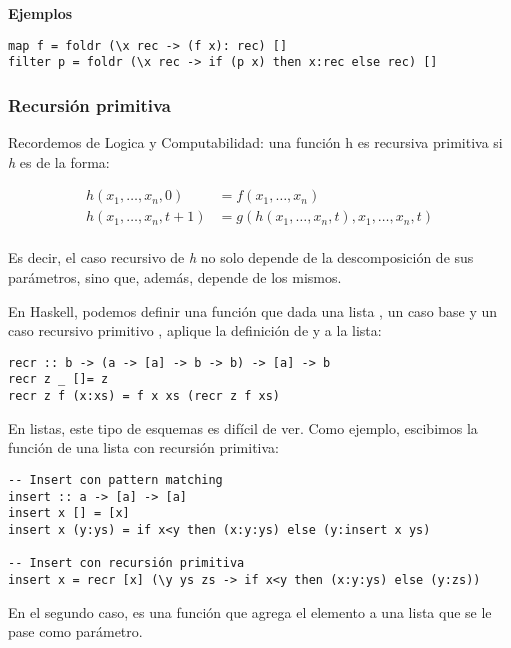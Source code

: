\textbf{Ejemplos}

\begin{centrado}
	\begin{verbatim}
map f = foldr (\x rec -> (f x): rec) []
filter p = foldr (\x rec -> if (p x) then x:rec else rec) []
	\end{verbatim}
\end{centrado}


\subsubsection{Recursión primitiva}
Recordemos de Logica y Computabilidad: una función h es recursiva primitiva si \textit{h} es de la forma:

\begin{align*}
	h(x_1,\dots,x_n,0) &= f(x_1,\dots,x_n) \\
	h(x_1,\dots,x_n,t+1) &= g(h(x_1,\dots,x_n, t),x_1,\dots, x_n, t) \\
\end{align*}

Es decir, el caso recursivo de \textit{h} no solo depende de la descomposición de sus parámetros, sino que, además, depende de los mismos.

En Haskell, podemos definir una función que dada una lista , un caso base  y un caso recursivo primitivo , aplique la definición de  y  a la lista:
\begin{centrado}
	\begin{verbatim}
recr :: b -> (a -> [a] -> b -> b) -> [a] -> b
recr z _ []= z
recr z f (x:xs) = f x xs (recr z f xs)
	\end{verbatim}
\end{centrado}

En listas, este tipo de esquemas es difícil de ver. Como ejemplo, escibimos la función  de una lista con recursión primitiva:
\begin{centrado}
	\begin{verbatim}
-- Insert con pattern matching
insert :: a -> [a] -> [a]
insert x [] = [x]
insert x (y:ys) = if x<y then (x:y:ys) else (y:insert x ys)
		
-- Insert con recursión primitiva
insert x = recr [x] (\y ys zs -> if x<y then (x:y:ys) else (y:zs))
	\end{verbatim}
\end{centrado}

En el segundo caso,  es una función que agrega el elemento  a una lista  que se le pase como parámetro.

